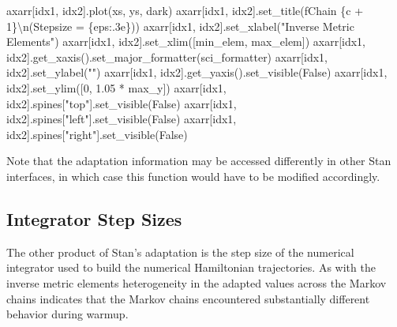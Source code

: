 \documentclass[
  letterpaper,
  DIV=11,
  numbers=noendperiod]{scrartcl}
\newenvironment{Shaded}{\begin{snugshade}}{\end{snugshade}}
\newcommand{\CharTok}[1]{\textcolor[rgb]{0.13,0.47,0.30}{#1}}
\newcommand{\DecValTok}[1]{\textcolor[rgb]{0.68,0.00,0.00}{#1}}
\newcommand{\FloatTok}[1]{\textcolor[rgb]{0.68,0.00,0.00}{#1}}
\newcommand{\NormalTok}[1]{\textcolor[rgb]{0.00,0.23,0.31}{#1}}
\newcommand{\OperatorTok}[1]{\textcolor[rgb]{0.37,0.37,0.37}{#1}}
\newcommand{\SpecialCharTok}[1]{\textcolor[rgb]{0.37,0.37,0.37}{#1}}
\newcommand{\SpecialStringTok}[1]{\textcolor[rgb]{0.13,0.47,0.30}{#1}}
\newcommand{\StringTok}[1]{\textcolor[rgb]{0.13,0.47,0.30}{#1}}
\newcommand{\VariableTok}[1]{\textcolor[rgb]{0.07,0.07,0.07}{#1}}
\begin{document}
\begin{Shaded}
\begin{Highlighting}[]
\NormalTok{    axarr[idx1, idx2].plot(xs, ys, dark)}
\NormalTok{    axarr[idx1, idx2].set\_title(}\SpecialStringTok{f\textquotesingle{}Chain }\SpecialCharTok{\{}\NormalTok{c }\OperatorTok{+} \DecValTok{1}\SpecialCharTok{\}}\CharTok{\textbackslash{}n}\SpecialStringTok{(Stepsize = }\SpecialCharTok{\{}\NormalTok{eps}\SpecialCharTok{:.3e\}}\SpecialStringTok{)\textquotesingle{}}\NormalTok{)}
\NormalTok{    axarr[idx1, idx2].set\_xlabel(}\StringTok{"Inverse Metric Elements"}\NormalTok{)}
\NormalTok{    axarr[idx1, idx2].set\_xlim([min\_elem, max\_elem])}
\NormalTok{    axarr[idx1, idx2].get\_xaxis().set\_major\_formatter(sci\_formatter)}
\NormalTok{    axarr[idx1, idx2].set\_ylabel(}\StringTok{""}\NormalTok{)}
\NormalTok{    axarr[idx1, idx2].get\_yaxis().set\_visible(}\VariableTok{False}\NormalTok{)}
\NormalTok{    axarr[idx1, idx2].set\_ylim([}\DecValTok{0}\NormalTok{, }\FloatTok{1.05} \OperatorTok{*}\NormalTok{ max\_y])}
\NormalTok{    axarr[idx1, idx2].spines[}\StringTok{"top"}\NormalTok{].set\_visible(}\VariableTok{False}\NormalTok{)}
\NormalTok{    axarr[idx1, idx2].spines[}\StringTok{"left"}\NormalTok{].set\_visible(}\VariableTok{False}\NormalTok{)}
\NormalTok{    axarr[idx1, idx2].spines[}\StringTok{"right"}\NormalTok{].set\_visible(}\VariableTok{False}\NormalTok{)}
  
\end{Highlighting}
\end{Shaded}

Note that the adaptation information may be accessed differently in
other Stan interfaces, in which case this function would have to be
modified accordingly.

\hypertarget{integrator-step-sizes}{%
\subsection{Integrator Step Sizes}\label{integrator-step-sizes}}

The other product of Stan's adaptation is the step size of the numerical
integrator used to build the numerical Hamiltonian trajectories. As with
the inverse metric elements heterogeneity in the adapted values across
the Markov chains indicates that the Markov chains encountered
substantially different behavior during warmup.
\end{document}
